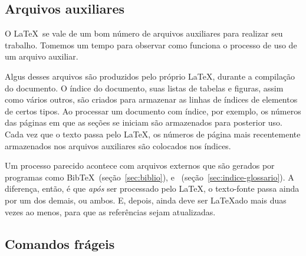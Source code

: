 



\subsection{Arquivos auxiliares}

O \LaTeX\ se vale de um bom número de arquivos auxiliares para
realizar seu trabalho. Tomemos um tempo para observar como funciona o
processo de uso de um arquivo auxiliar.

Algus desses arquivos são produzidos pelo próprio \LaTeX, durante a
compilação do documento. O índice do documento, suas listas de tabelas
e figuras, assim como vários outros, são criados para armazenar as
linhas de índices de elementos de certos tipos. Ao processar um
documento com índice, por exemplo, os números das páginas em que as
seções se iniciam são armazenados para posterior uso. Cada vez que o
texto passa pelo \LaTeX, os números de página mais recentemente
armazenados nos arquivos auxiliares são colocados nos índices.

Um processo parecido acontece com arquivos externos que são gerados
por programas como Bib\TeX\ (seção~\ref{sec:biblio}),
 e~
(seção~\ref{sec:indice-glossario}). A diferença, então, é que
\emph{após} ser processado pelo \LaTeX, o
texto-fonte passa ainda por um dos demais, ou
ambos. E, depois, ainda deve ser \LaTeX ado mais duas vezes ao menos,
para que as referências sejam atualizadas.


\subsection{Comandos frágeis}

